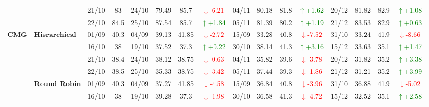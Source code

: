{\begin{longtable}{llcc|cccc|cccc|cccc}
&
& 21/10 & 83 & 24/10 & 79.49 & 85.7 & \textcolor{red}{\(\downarrow\)-6.21} & 04/11 & 80.18 & 81.8 & \textcolor{green}{\(\uparrow\)+1.62} & 20/12 & 81.82 & 82.9 & \textcolor{green}{\(\uparrow\)+1.08} \\

&
& 22/10 & 84.5 & 25/10 & 87.54 & 85.7 & \textcolor{green}{\(\uparrow\)+1.84} & 05/11 & 81.39 & 80.2 & \textcolor{green}{\(\uparrow\)+1.19} & 21/12 & 83.53 & 82.9 & \textcolor{green}{\(\uparrow\)+0.63} \\
\midrule






\multirow{12}{*}{\textbf{CMG}} 
& \textbf{Hierarchical}
& 01/09 & 40.3 & 04/09 & 39.13 & 41.85 & \textcolor{red}{\(\downarrow\)-2.72} & 15/09 & 33.28 & 40.8 & \textcolor{red}{\(\downarrow\)-7.52} & 31/10 & 33.24 & 41.9 & \textcolor{red}{\(\downarrow\)-8.66} \\

& 
& 16/10 & 38 & 19/10 & 37.52 & 37.3 & \textcolor{green}{\(\uparrow\)+0.22} & 30/10 & 38.14 & 41.3 & \textcolor{green}{\(\uparrow\)+3.16} & 15/12 & 33.63 & 35.1 & \textcolor{green}{\(\uparrow\)+1.47} \\

& 
& 21/10 & 38.4 & 24/10 & 38.12 & 38.75 & \textcolor{red}{\(\downarrow\)-0.63} & 04/11 & 35.82 & 39.6 & \textcolor{red}{\(\downarrow\)-3.78} & 20/12 & 31.82 & 35.2 & \textcolor{green}{\(\uparrow\)+3.38} \\

&
& 22/10 & 38.5 & 25/10 & 35.33 & 38.75 & \textcolor{red}{\(\downarrow\)-3.42} & 05/11 & 37.44 & 39.3 & \textcolor{red}{\(\downarrow\)-1.86} & 21/12 & 31.21 & 35.2 & \textcolor{green}{\(\uparrow\)+3.99} \\
\cmidrule(lr){2-16}


& \textbf{Round Robin}
& 01/09 & 40.3 & 04/09 & 37.27 & 41.85 & \textcolor{red}{\(\downarrow\)-4.58} & 15/09 & 36.84 & 40.8 & \textcolor{red}{\(\downarrow\)-3.96} & 31/10 & 36.88 & 41.9 & \textcolor{red}{\(\downarrow\)-5.02} \\

& 
& 16/10 & 38 & 19/10 & 39.28 & 37.3 & \textcolor{red}{\(\downarrow\)-1.98} & 30/10 & 36.58 & 41.3 & \textcolor{red}{\(\downarrow\)-4.72} & 15/12 & 32.52 & 35.1 & \textcolor{green}{\(\uparrow\)+2.58} \\


\end{longtable}}
